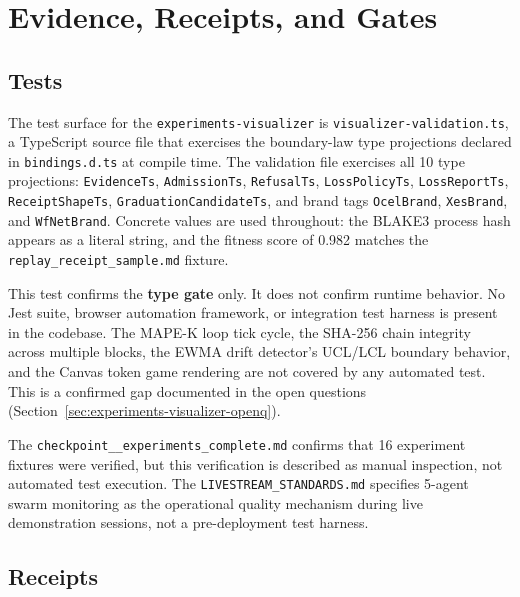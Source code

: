 
\section{Evidence, Receipts, and Gates}
\label{sec:experiments-visualizer-evidence}

\subsection{Tests}
\label{sec:experiments-visualizer-evidence-tests}

The test surface for the \texttt{experiments-visualizer} is \texttt{visualizer-validation.ts},
a TypeScript source file that exercises the boundary-law type projections declared in
\texttt{bindings.d.ts} at compile time. The validation file exercises all 10 type projections:
\texttt{EvidenceTs}, \texttt{AdmissionTs}, \texttt{RefusalTs}, \texttt{LossPolicyTs},
\texttt{LossReportTs}, \texttt{ReceiptShapeTs}, \texttt{GraduationCandidateTs}, and brand tags
\texttt{OcelBrand}, \texttt{XesBrand}, and \texttt{WfNetBrand}. Concrete values are used
throughout: the BLAKE3 process hash appears as a literal string, and the fitness score of 0.982
matches the \texttt{replay\_receipt\_sample.md} fixture.

This test confirms the \textbf{type gate} only. It does not confirm runtime behavior. No Jest
suite, browser automation framework, or integration test harness is present in the codebase.
The MAPE-K loop tick cycle, the SHA-256 chain integrity across multiple blocks, the EWMA drift
detector's UCL/LCL boundary behavior, and the Canvas token game rendering are not covered by
any automated test. This is a confirmed gap documented in the open questions
(Section~\ref{sec:experiments-visualizer-openq}).

The \texttt{checkpoint\_\_experiments\_complete.md} confirms that 16 experiment fixtures were
verified, but this verification is described as manual inspection, not automated test execution.
The \texttt{LIVESTREAM\_STANDARDS.md} specifies 5-agent swarm monitoring as the operational
quality mechanism during live demonstration sessions, not a pre-deployment test harness.

\subsection{Receipts}
\label{sec:experiments-visualizer-evidence-receipts}


